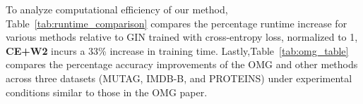 



To analyze computational efficiency of our method, Table~\ref{tab:runtime_comparison} compares the percentage runtime increase for various methods relative to GIN trained with cross-entropy loss, normalized to 1, \textbf{CE+W2} incurs a 33\% increase in training time. 
Lastly,Table~\ref{tab:omg_table} compares the percentage accuracy improvements of the OMG \cite{omg7} and other methods across three datasets (MUTAG, IMDB-B, and PROTEINS) under experimental conditions similar to those in the OMG paper.

